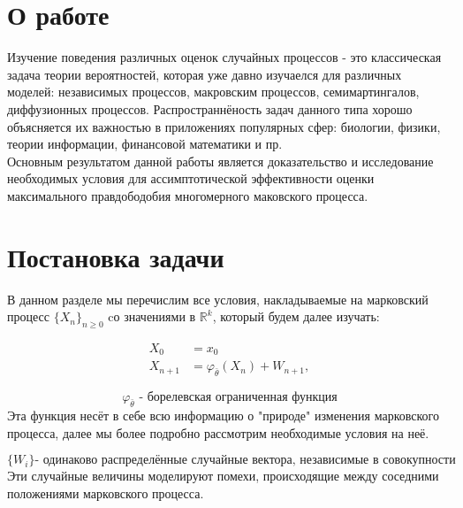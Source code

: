 
\newtheorem{Theorem}{Теорема}
\newtheorem{Proof}{Доказательство теоремы}
\newtheorem{Definition}{Определение}
\newtheorem{Lemma}{Лемма}
\newtheorem{Designation}{Обозначение}


\newpage
\section{О работе}
\cite{CramerRaoDiffenition}
\cite{VeretennikovLectures16}
Изучение поведения различных оценок случайных процессов - это классическая задача теории вероятностей, которая уже давно изучаелся для различных моделей: независимых процессов, макровским процессов, семимартингалов, диффузионных процессов. Распространнёность задач данного типа хорошо объясняется их важностью в приложениях популярных сфер: биологии, физики, теории информации, финансовой математики и пр.
\\
Основным результатом данной работы является доказательство и исследование необходимых условия для ассимптотической эффективности оценки максимального правдободобия многомерного маковского процесса.
\newpage

\section{Постановка задачи}
В данном разделе мы перечислим все условия, накладываемые на марковский процесс $\{X_n\}_{n \geqslant 0}$ cо значениями в $\mathbb{R}^k$, который будем далее изучать:

\begin{equation} \label{process_definition}
    \begin{split}
    X_0 &= x_0 \\
    X_{n+1} &=\varphi_{\bar{\theta}}\left(X_n\right)+W_{n+1},
    \end{split}
\end{equation}

\begin{equation}
    \text{$\varphi_{\bar{\theta}}$ - борелевская ограниченная функция}
\end{equation}
Эта функция несёт в себе всю информацию о "природе" изменения марковского процесса, далее мы более подробно рассмотрим необходимые условия на неё.

\begin{equation}
    \text{\{$W_i$\} - одинаково распределённые случайные вектора, независимые в совокупности}
\end{equation}
Эти случайные величины моделируют помехи, происходящие между соседними положениями марковского процесса.

